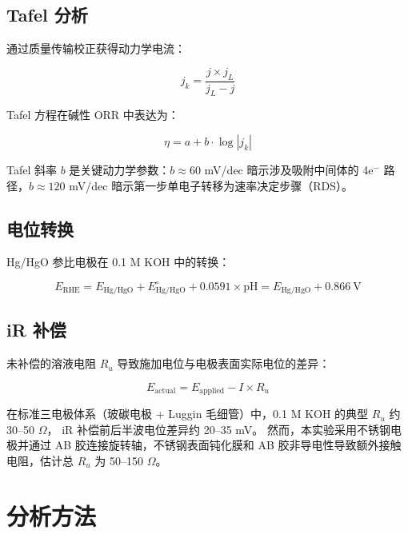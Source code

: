 \documentclass[12pt,a4paper]{ctexart}
\begin{document}
\subsection{Tafel 分析}

通过质量传输校正获得动力学电流\cite{bard2001}：

\begin{equation}
j_k = \frac{j \times j_L}{j_L - j}
\label{eq:mt_correction}
\end{equation}

Tafel 方程在碱性 ORR 中表达为：

\begin{equation}
\eta = a + b \cdot \log|j_k|
\label{eq:tafel}
\end{equation}

Tafel 斜率 $b$ 是关键动力学参数：$b \approx 60$ mV/dec 暗示涉及吸附中间体的
4e$^-$ 路径，$b \approx 120$ mV/dec 暗示第一步单电子转移为速率决定步骤（RDS）。

\subsection{电位转换}

Hg/HgO 参比电极在 0.1 M KOH 中的转换：

\begin{equation}
E_{\text{RHE}} = E_{\text{Hg/HgO}} + E^\circ_{\text{Hg/HgO}} + 0.0591 \times \text{pH}
 = E_{\text{Hg/HgO}} + 0.866\ \text{V}
\end{equation}

\subsection{iR 补偿}

未补偿的溶液电阻 $R_u$ 导致施加电位与电极表面实际电位的差异\cite{vliet2010}：

\begin{equation}
E_{\text{actual}} = E_{\text{applied}} - I \times R_u
\end{equation}

在标准三电极体系（玻碳电极 + Luggin 毛细管）中，0.1 M KOH 的典型 $R_u$ 约 30--50 $\Omega$，
iR 补偿前后半波电位差异约 20--35 mV\cite{vliet2010}。
然而，本实验采用不锈钢电极并通过 AB 胶连接旋转轴，不锈钢表面钝化膜和
AB 胶非导电性导致额外接触电阻，估计总 $R_u$ 为 50--150 $\Omega$。

\newpage

\section{分析方法}
\end{document}
